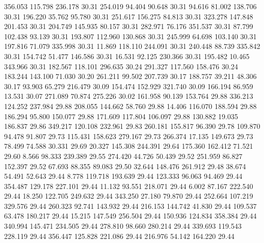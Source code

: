 356.053  115.798  236.178        30.31
 254.019   94.404   90.648        30.31
  94.616   81.002  138.706        30.31
 196.220   35.762   95.780        30.31
 251.617  156.275   84.813        30.31
 323.278  147.848  201.453        30.31
 204.749  145.935   80.157        30.31
 282.971   76.176  351.537        30.31
  87.799  102.438   93.139        30.31
 193.807  112.960  130.868        30.31
 245.999   64.698  103.140        30.31
 197.816   71.079  335.998        30.31
  11.869  118.110  244.091        30.31
 240.448   88.739  335.842        30.31
 154.742   51.477  146.586        30.31
  16.531   92.125  230.366        30.31
 195.482   10.465  343.966        30.31
 182.567  118.101  296.635        30.24
 291.327  117.560  158.476        30.24
 183.244  143.100   71.030        30.20
 261.211   99.502  207.739        30.17
 188.757   39.211   48.306        30.17
  93.903   65.279  216.479        30.09
 154.474  152.929  321.740        30.09
 166.194   86.959   13.531        30.07
 271.089   70.874  275.226        30.02
 161.958   90.139  153.764        29.88
 336.213  124.252  237.984        29.88
 208.055  144.662   58.760        29.88
  14.406  116.070  188.594        29.88
 186.294   95.800  150.077        29.88
 171.609  117.804  106.097        29.88
 130.882   19.035  186.837        29.86
 349.217  120.108  232.961        29.83
 260.181  155.817   96.390        29.78
 109.870   94.478   91.807        29.73
 115.431  158.623  279.167        29.73
 266.374   17.135  149.673        29.73
  78.499   74.588   30.331        29.69
  20.327  145.308  244.391        29.64
 175.360  162.412   71.521        29.60
   8.566   98.333  239.389        29.55
 274.420   44.726   50.439        29.52
 251.959   86.827  152.397        29.52
  67.693   88.355   89.083        29.50
  32.644  148.476  261.912        29.48
  38.674   54.491   52.643        29.44
   8.778  119.718  193.639        29.44
 123.333   96.063   94.469        29.44
 354.487  129.178  227.101        29.44
  11.132   93.551  218.071        29.44
   6.002   87.167  222.540        29.44
  18.250  122.705  249.632        29.44
 343.250   27.180   79.870        29.44
 252.664  107.219  329.576        29.44
 260.323   92.741  143.932        29.44
 216.153  144.742   41.830        29.44
 109.537   63.478  180.217        29.44
  15.215  147.549  256.504        29.44
 150.936  124.834  358.384        29.44
 340.994  145.471  234.505        29.44
 278.810   98.660  280.214        29.44
 339.693  119.543  228.119        29.44
 356.447  125.828  221.086        29.44
 216.976   54.142  164.220        29.44

